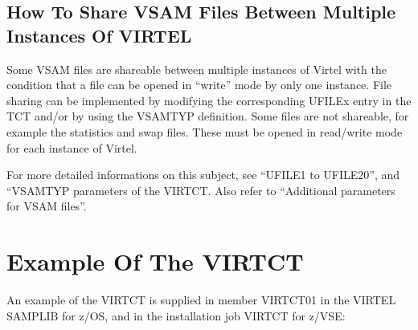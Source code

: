 \documentclass[letterpaper,10pt,english]{sphinxmanual}
\begin{document}

\subsection{How To Share VSAM Files Between Multiple Instances Of VIRTEL}
\label{\detokenize{Installation_Guide:index-144}}\label{\detokenize{Installation_Guide:how-to-share-vsam-files-between-multiple-instances-of-virtel}}
Some VSAM files are shareable between multiple instances of Virtel with the condition that a file can be opened in “write” mode by only one instance. File sharing can be implemented by modifying the corresponding UFILEx entry in the TCT and/or by using the VSAMTYP definition. Some files are not shareable, for example the statistics and swap files. These must be opened in read/write mode for each instance of Virtel.

For more detailed informations on this subject, see “UFILE1 to UFILE20”, and “VSAMTYP parameters of the VIRTCT. Also refer to “Additional parameters for VSAM files”.

\newpage


\section{Example Of The VIRTCT}
\label{\detokenize{Installation_Guide:example-of-the-virtct}}
An example of the VIRTCT is supplied in member VIRTCT01 in the VIRTEL SAMPLIB for z/OS, and in the installation job VIRTCT for z/VSE:
\end{document}
